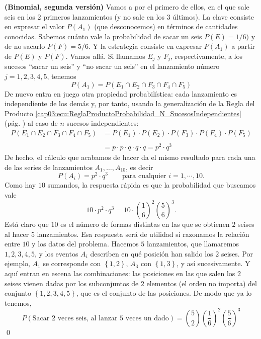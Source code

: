 \begin{Ejemplo}{\bf (Binomial, segunda versión)}
        Vamos a por el primero de ellos, en el que sale seis en los $2$  primeros lanzamientos (y no sale en los $3$ \'ultimos). La clave consiste en expresar el valor $P(A_1)$ (que desconocemos) en términos de cantidades conocidas. Sabemos cuánto vale la probabilidad de sacar un seis $P(E)=1/6)$ y de no sacarlo $P(F)=5/6$. Y la estrategia consiste en expresar $P(A_1)$ a partir de $P(E)$ y $P(F)$. Vamos allá. Si llamamos $E_j$ y $F_j$, respectivamente, a los sucesos ``sacar un seis'' y ``no sacar un seis''  en el lanzamiento n\'umero $j=1,2,3,4,5$, tenemos
          	\[P(A_1)=P(E_1\cap E_2 \cap F_3\cap F_4\cap F_5)\]
        De nuevo entra en juego otra propiedad probabilística: cada lanzamiento es independiente de los dem\'as y, por tanto, usando la generalización de la Regla del Producto \ref{cap03:ecu:ReglaProductoProbabilidad_N_SucesosIndependientes} (pág. \pageref{cap03:ecu:ReglaProductoProbabilidad_N_SucesosIndependientes}) al caso de $n$ sucesos independientes:
          	\[\begin{array}{rl}
          	P(E_1\cap E_2 \cap F_3\cap F_4\cap F_5)& =P(E_1)\cdot P( E_2 )\cdot P( F_3)\cdot P( F_4)
          	\cdot P( F_5) \\
          	& \\
          	& =p\cdot p \cdot q \cdot q \cdot q = p^2\cdot q^3
          	\end{array}\]
        De hecho, el c\'alculo que acabamos de hacer da el mismo resultado para cada una           	de las series de lanzamientos $A_1,\ldots,A_{10}$, es decir
          		\[P(A_i)=p^2\cdot q^3 \qquad \text{para cualquier }i=1,\cdots,10. \]
        Como hay $10$ sumandos, la respuesta r\'apida es que la probabilidad que buscamos vale
          		\[10\cdot p^2\cdot q^3=10\cdot\left( \dfrac{1}{6}\right)^2\left(\dfrac{5}{6}\right)^3. \]	
          	Est\'a claro que $10$ es el n\'umero de formas distintas en las que se obtienen $2$ seises
          	al hacer $5$ lanzamientos.
          	Esa respuesta ser\'a de utilidad si razonamos la relaci\'on entre $10$
          	y los datos del problema. Hacemos $5$ lanzamientos, que llamaremos $1,2,3,4,5$,
          	y los eventos $A_i$ 	describen en qu\'e posici\'on han salido los $2$ seises.
          	Por ejemplo, $A_1$ se corresponde con $\left\{1,2\right\}$, $A_3$ con $\left\{1,3\right\}$,
          	y as\'i sucesivamente. Y aqu\'i entran en escena las combinaciones:
          	las posiciones en las que salen los $2$ seises vienen dadas por los
          	subconjuntos de $2$ elementos (el orden no importa) del conjunto
          	 $\left\{1,2,3,4,5\right\}$, que es el conjunto 	de las posiciones.
          	De modo que ya lo tenemos,
          		\[P(\text{Sacar $2$ veces seis, al lanzar $5$ veces un dado})=
          		\binom{5}{2}\left( \dfrac{1}{6}\right)^2\left(\dfrac{5}{6}\right)^3\]
          \qed
\end{Ejemplo}

